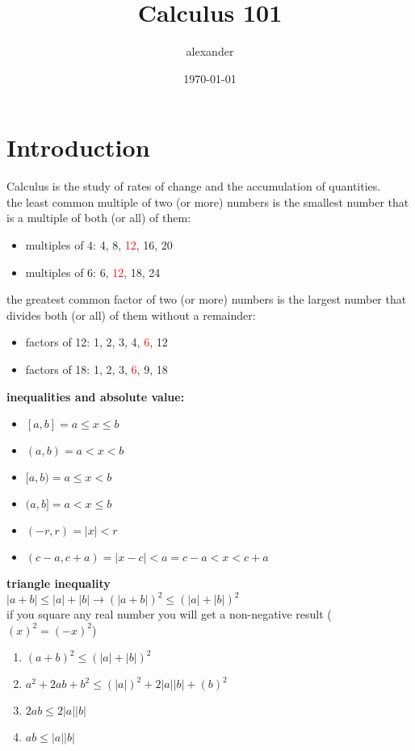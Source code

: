 \documentclass{article}
\title{Calculus 101}
\author{alexander}
\date{\today}
\begin{document}
\maketitle

\section*{Introduction}

Calculus is the study of rates of change and the accumulation of quantities.\\

the least common multiple of two (or more) numbers is the smallest number that is a multiple of both (or all) of them:\\
	\begin{itemize}
		\item multiples of 4: 4, 8, \textcolor{red}{12}, 16, 20
		\item multiples of 6: 6, \textcolor{red}{12}, 18, 24
	\end{itemize}

the greatest common factor of two (or more) numbers is the largest number that divides both (or all) of them without a remainder:
	\begin{itemize}
		\item factors of 12: 1, 2, 3, 4, \textcolor{red}{6}, 12
		\item factors of 18: 1, 2, 3, \textcolor{red}{6}, 9, 18
	\end{itemize}

\textbf{inequalities and absolute value:}
	\begin{itemize}	
		\item $[a, b] = a \leq x \leq b$
		\item $(a, b) = a < x < b$
		\item $[a, b) = a \leq x < b$
		\item $(a, b] = a < x \leq b$
		\item $(-r, r) = \lvert x\rvert < r$
		\item $(c - a, c + a) = \lvert x - c\rvert < a = c - a < x < c + a$
	\end{itemize}

\textbf{triangle inequality}\\

$\lvert a + b\rvert \leq \lvert a \rvert + \lvert b\rvert \to (\lvert a + b\rvert)^2 \leq (\lvert a \rvert + \lvert b\rvert)^2$\\

if you square any real number you will get a non-negative result ($(x)^2 = (-x)^2$)
	\begin{enumerate}
		\item $(a + b)^2 \leq (\lvert a\rvert + \lvert b\rvert)^2$
		\item $a^2 + 2ab + b^2 \leq (\lvert a\rvert)^2 + 2\lvert a\rvert\lvert b\rvert + (b)^2$
		\item $2ab \leq 2\lvert a\rvert\lvert b \rvert$
		\item $ab \leq \lvert a\rvert\lvert b\rvert$
	\end{enumerate}
\end{document}
